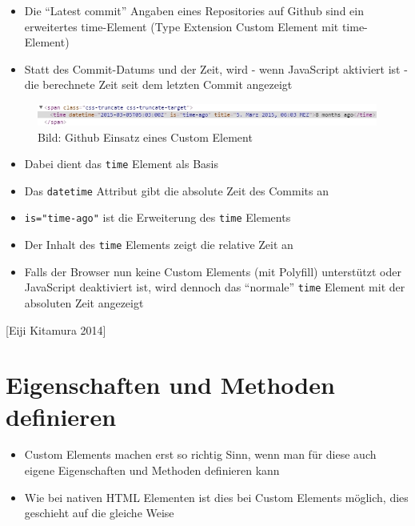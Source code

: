 \documentclass[11pt,a4paper]{report}
\providecommand{\tightlist}{%
  \setlength{\itemsep}{0pt}\setlength{\parskip}{0pt}}
\begin{document}
\begin{itemize}
\tightlist
\item
  Die ``Latest commit'' Angaben eines Repositories auf Github sind ein
  erweitertes time-Element (Type Extension Custom Element mit
  time-Element)
\item
  Statt des Commit-Datums und der Zeit, wird - wenn JavaScript aktiviert
  ist - die berechnete Zeit seit dem letzten Commit angezeigt
\end{itemize}

\begin{figure}[htbp]
\centering
\includegraphics{images/1-custom-elements-github-time-element.jpg}
\caption{Bild: Github Einsatz eines Custom Element}
\end{figure}

\begin{itemize}
\tightlist
\item
  Dabei dient das \texttt{time} Element als Basis
\item
  Das \texttt{datetime} Attribut gibt die absolute Zeit des Commits an
\item
  \texttt{is="time-ago"} ist die Erweiterung des \texttt{time} Elements
\item
  Der Inhalt des \texttt{time} Elements zeigt die relative Zeit an
\item
  Falls der Browser nun keine Custom Elements (mit Polyfill) unterstützt
  oder JavaScript deaktiviert ist, wird dennoch das ``normale''
  \texttt{time} Element mit der absoluten Zeit angezeigt
\end{itemize}

{[}Eiji Kitamura 2014{]}

\section{Eigenschaften und Methoden
definieren}\label{eigenschaften-und-methoden-definieren}

\begin{itemize}
\tightlist
\item
  Custom Elements machen erst so richtig Sinn, wenn man für diese auch
  eigene Eigenschaften und Methoden definieren kann
\item
  Wie bei nativen HTML Elementen ist dies bei Custom Elements möglich,
  dies geschieht auf die gleiche Weise
\end{itemize}
\end{document}
